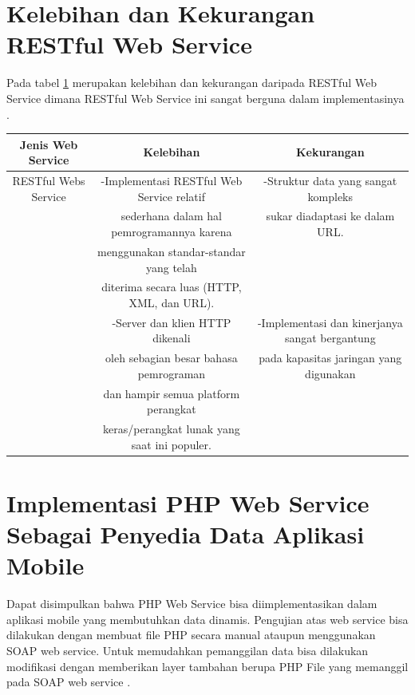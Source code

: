 \section{Kelebihan dan Kekurangan RESTful Web Service}
Pada tabel \ref{table:contoh} merupakan kelebihan dan kekurangan daripada RESTful Web Service dimana RESTful Web Service ini sangat berguna dalam implementasinya \cite{nugroho2012perbandingan}.
\begin{table}[h]
\begin{tabular}{|c|c|c|}
\hline
Jenis Web Service&Kelebihan&Kekurangan\\
\hline
RESTful Webs Service&-Implementasi RESTful Web Service relatif& -Struktur data yang sangat kompleks\\
&sederhana dalam hal pemrogramannya karena& sukar diadaptasi ke dalam URL.\\
&menggunakan standar-standar yang telah&\\
&diterima secara luas (HTTP, XML, dan URL).&\\
&-Server dan klien HTTP dikenali&-Implementasi dan kinerjanya sangat bergantung\\
&oleh sebagian besar bahasa pemrograman&pada kapasitas jaringan yang digunakan\\
&dan hampir semua platform perangkat&\\
&keras/perangkat lunak yang saat ini populer.&\\
\hline
\end{tabular}
\label{table:contoh}
\end{table}

\section{Implementasi PHP Web Service Sebagai Penyedia Data Aplikasi Mobile}
Dapat disimpulkan bahwa PHP Web Service bisa diimplementasikan dalam aplikasi mobile yang membutuhkan data dinamis. Pengujian atas web service bisa dilakukan dengan membuat file PHP secara manual ataupun menggunakan SOAP web service. Untuk memudahkan pemanggilan data bisa dilakukan modifikasi dengan memberikan layer tambahan berupa PHP File yang memanggil pada SOAP web service
\cite{surendra2014implementasi}.
